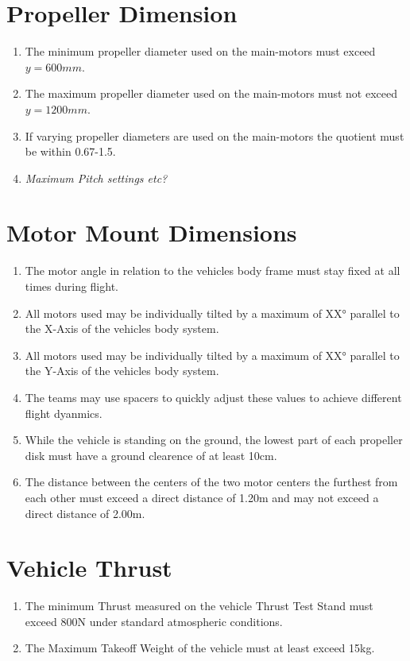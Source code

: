 \documentclass{article}
\begin{document}
\section{Propeller Dimension}
\begin{enumerate}
  \item The minimum propeller diameter used on the main-motors must exceed $y=600mm$.
  \item The maximum propeller diameter used on the main-motors must not exceed $y=1200mm$.
  \item If varying propeller diameters are used on the main-motors the quotient must be within 0.67-1.5.
  \item \emph{Maximum Pitch settings etc?}
\end{enumerate}

\section{Motor Mount Dimensions}
\begin{enumerate}
  \item The motor angle in relation to the vehicles body frame must stay fixed at all times during flight. 
  \item All motors used may be individually tilted by a maximum of XX° parallel to the X-Axis of the vehicles body system.
  \item All motors used may be individually tilted by a maximum of XX° parallel to the Y-Axis of the vehicles body system.
  \item The teams may use spacers to quickly adjust these values to achieve different flight dyanmics.
  \item While the vehicle is standing on the ground, the lowest part of each propeller disk must have a ground clearence of at least 10cm. 
  \item The distance between the centers of the two motor centers the furthest from each other must exceed a direct distance of 1.20m and may not exceed a direct distance of 2.00m. 
\end{enumerate}


\section{Vehicle Thrust}
\begin{enumerate}
  \item The minimum Thrust measured on the vehicle Thrust Test Stand must exceed 800N under standard atmospheric conditions. 
  \item The Maximum Takeoff Weight of the vehicle must at least exceed 15kg.  
\end{enumerate}
\end{document}
